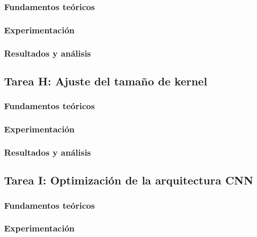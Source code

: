 \documentclass[11pt,a4paper]{article}
\begin{document}
\subsubsection{Fundamentos teóricos}

\subsubsection{Experimentación}

\subsubsection{Resultados y análisis}

\subsection{Tarea H: Ajuste del tamaño de kernel}
\subsubsection{Fundamentos teóricos}

\subsubsection{Experimentación}

\subsubsection{Resultados y análisis}

\subsection{Tarea I: Optimización de la arquitectura CNN}
\subsubsection{Fundamentos teóricos}

\subsubsection{Experimentación}
\end{document}

